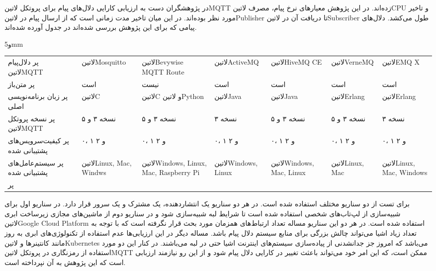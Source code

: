 
در  پژوهشگران دست به ارزیابی کارایی دلال‌های پیام برای پروتکل ‌لاتین{MQTT} زده‌اند. در این پژوهش معیارهای نرخ پیام، مصرف ‌لاتین{CPU} و تاخیر مورد نظر بوده‌اند.
در این میان تاخیر مدت زمانی است که از ارسال پیام در ‌لاتین{Publisher} تا دریافت آن در ‌لاتین{Subscriber} طول می‌کشد.
دلال‌های پیامی که برای این پژوهش بررسی شده‌اند در جدول  آورده شده‌اند.

‌و{5mm}
\begin{tabularx}
  {\textwidth}
  {p{3cm}*6{X}}
‌پر
دلال‌پیام ‌لاتین{MQTT} & ‌لاتین{Mosquitto} & ‌لاتین{Bevywise MQTT Route} & ‌لاتین{ActiveMQ} & ‌لاتین{HiveMQ CE} & ‌لاتین{VerneMQ} & ‌لاتین{EMQ X} \\
‌پر
متن‌باز & است & نیست & است & است & است & است \\
‌پر
زبان برنامه‌نویسی اصلی & ‌لاتین{C} & ‌لاتین{C} و ‌لاتین{Python} & ‌لاتین{Java} & ‌لاتین{Java} & ‌لاتین{Erlang} & ‌لاتین{Erlang} \\
‌پر
نسخه پروتکل ‌لاتین{MQTT} & نسخه ۳ و ۵ & نسخه ۳ و ۵ & نسخه ۳ & نسخه ۳ و ۵ & نسخه ۳ و ۵ & نسخه ۳ \\
‌پر
کیفیت‌سرویس‌های پشتیبانی شده & ۰، ۱ و ۲ & ۰، ۱ و ۲ & ۰، ۱ و ۲ & ۰، ۱ و ۲ & ۰، ۱ و ۲ & ۰، ۱ و ۲ \\
‌پر
سیستم‌عامل‌های پشتبیانی شده & ‌لاتین{Linux, Mac, Windws} & ‌لاتین{Windows, Linux, Mac, Raspberry Pi} & ‌لاتین{Windows, Linux} & ‌لاتین{Windows, Mac, Linux} & ‌لاتین{Linux, Mac} & ‌لاتین{Linux, Mac, Windows} \\
‌پر
\end{tabularx}

برای تست از دو سناریو مختلف استفاده شده است. در هر دو سناریو یک انتشاردهنده، یک مشترک و یک سرور قرار دارد. در سناریو اول برای شبیه‌سازی از لپ‌تاب‌های شخصی استفاده شده است
تا شرایط لبه شبیه‌سازی شود و در سناریو دوم از ماشین‌های مجازی زیرساخت ابری ‌لاتین{Google Cloud Platform} استفاده شده است.
در هر دو این سناریو مساله تعداد ارتباط‌های همزمان مورد بحث قرار نگرفته است که با توجه به تعداد زیاد اشیا می‌تواند چالش بزرگی برای منابع سیستم دلال پیام باشد.
مساله دیگر در این ارزیابی‌ها عدم استفاده از تکنولوژی‌های ابری به روز مانند کانتینرها و ‌لاتین{Kubernetes} می‌باشد که امروز جز جدانشدنی از پیاده‌سازی سیستم‌های اینترنت اشیا حتی در لبه می‌باشند.
در کنار این دو مورد استفاده از رمزنگاری در پروتکل ‌لاتین{MQTT} ممکن است، که این امر خود می‌تواند باعثث تغییر در کارایی دلال پیام شود و از این رو نیازمند ارزبابی است که این پژوهش به آن نپرداخته است.

